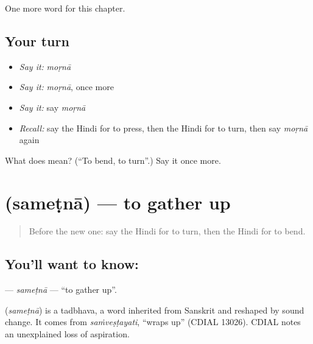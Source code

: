 \begin{grammarlens}[title={What you've built}]
One more word for this chapter.
\end{grammarlens}

\subsection*{Your turn}
\begin{itemize}
\raggedright
  \item \emph{Say it:} \emph{moṛnā}
  \item \emph{Say it:} \emph{moṛnā}, once more
  \item \emph{Say it:} say \emph{moṛnā}
  \item \emph{Recall:} say the Hindi for to press, then the Hindi for to turn, then say \emph{moṛnā} again
\end{itemize}

\begin{tcolorbox}[breakable,colback=teal!4,colframe=teal!35!black,title={Before you move on}]
What does  mean? (\textquotedblleft{}To bend, to turn\textquotedblright{}.) Say it once more.
\end{tcolorbox}
\section[\texorpdfstring{\hi{समेटना} (sameṭnā)}{समेटना (sameṭnā)}]{ (sameṭnā) — to gather up}

\label{lesson:HI-C229-sametna}



\begin{quote}
Before the new one: say the Hindi for to turn, then the Hindi for to bend.
\end{quote}

\subsection*{You'll want to know: }
\textbf{} — \emph{sameṭnā} — \textquotedblleft{}to gather up\textquotedblright{}.

\begin{cousinweb}
\textbf{} (\emph{sameṭnā}) is a tadbhava, a word inherited from Sanskrit and reshaped by sound change. It comes from \emph{saṁveṣṭayati}, \textquotedblleft{}wraps up\textquotedblright{} (CDIAL 13026). CDIAL notes an unexplained loss of aspiration.
\end{cousinweb}

